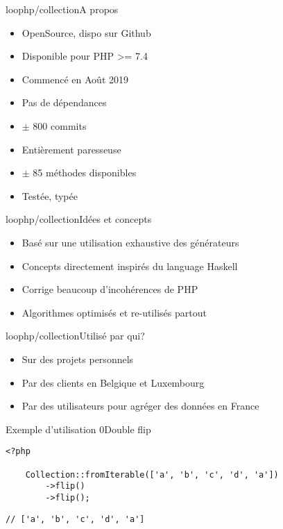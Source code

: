 \begin{frame}{loophp/collection}{A propos}
    \begin{itemize}[<+->]
        \item OpenSource, dispo sur Github
        \item Disponible pour PHP >= 7.4
        \item Commencé en Août 2019
        \item Pas de dépendances
        \item $\pm$ 800 commits
        \item Entièrement paresseuse
        \item $\pm$ 85 méthodes disponibles
        \item Testée, typée
    \end{itemize}
\end{frame}

\begin{frame}{loophp/collection}{Idées et concepts}
    \begin{itemize}[<+->]
        \item Basé sur une utilisation exhaustive des générateurs
        \item Concepts directement inspirés du language Haskell
        \item Corrige beaucoup d'incohérences de PHP
        \item Algorithmes optimisés et re-utilisés partout
    \end{itemize}
\end{frame}

\begin{frame}{loophp/collection}{Utilisé par qui?}
    \begin{itemize}[<+->]
        \item Sur des projets personnels
        \item Par des clients en Belgique et Luxembourg
        \item Par des utilisateurs pour agréger des données en France
    \end{itemize}
\end{frame}

\begin{frame}[fragile]{Exemple d'utilisation 0}{Double flip}
    \begin{lstlisting}[firstnumber=1]
    <?php

    Collection::fromIterable(['a', 'b', 'c', 'd', 'a'])
        ->flip()
        ->flip();
    \end{lstlisting}

    \pause

    \begin{lstlisting}[firstnumber=8]
    // ['a', 'b', 'c', 'd', 'a']
    \end{lstlisting}
\end{frame}

